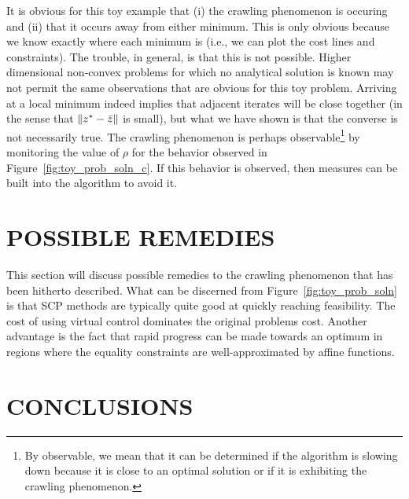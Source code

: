 \documentclass[letterpaper, 10 pt, conference]{ieeeconf}
\begin{document}
It is obvious for this toy example that (i) the crawling phenomenon is occuring and (ii) that it occurs away from either minimum. This is only obvious because we know exactly where each minimum is (i.e., we can plot the cost lines and constraints). The trouble, in general, is that this is not possible. Higher dimensional non-convex problems for which no analytical solution is known may not permit the same observations that are obvious for this toy problem. Arriving at a local minimum indeed implies that adjacent iterates will be close together (in the sense that $\|z^*-\bar{z}\|$ is small), but what we have shown is that the converse is not necessarily true. The crawling phenomenon is perhaps observable\footnote{By observable, we mean that it can be determined if the algorithm is slowing down because it is close to an optimal solution or if it is exhibiting the crawling phenomenon.} by monitoring the value of $\rho$ for the behavior observed in Figure~\ref{fig:toy_prob_soln_c}. If this behavior is observed, then measures can be built into the algorithm to avoid it. 


\section{POSSIBLE REMEDIES}\label{sec:remedies}

This section will discuss possible remedies to the crawling phenomenon that has been hitherto described. What can be discerned from Figure~\ref{fig:toy_prob_soln} is that SCP methods are typically quite good at quickly reaching feasibility. The cost of using virtual control dominates the original problems cost. Another advantage is the fact that rapid progress can be made towards an optimum in regions where the equality constraints are well-approximated by affine functions.


\section{CONCLUSIONS}\label{sec:conclusion}
\end{document}
